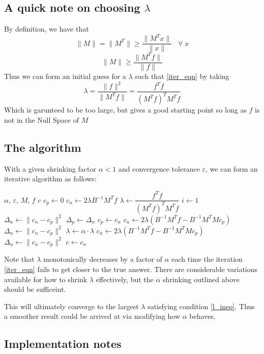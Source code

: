 \documentclass[12pt,a4paper]{article}
\newcommand{\eps}{\varepsilon}
\begin{document}
\subsection{A quick note on choosing $\lambda$}
By definition, we have that
\[
    \| M \| = \| M^T \| \ge \dfrac{\|M^Tx\|}{\|x\|} \;\;\; \forall \; x 
\]
\[
    \| M \| \ge \dfrac{\|M^Tf\|}{\|f\|}
\]
Thus we can form an initial guess for a $\lambda$ such that \ref{iter_eqn} by
taking
\[
    \lambda = \dfrac{\|f\|^2}{\|M^T f\|} = \dfrac{f^T f}{(M^T f)^T M^T f}
\]
Which is garunteed to be too large, but gives a good starting point so long as
$f$ is not in the Null Space of $M$

\newpage
\subsection{The algorithm}
With a given shrinking factor $\alpha < 1$ and convergence tolerance $\eps$,
we can form an iterative algorithm as follows:
\begin{algorithmic}
    \Require $\alpha$, $\eps$, $M$, $f$ 
    \Ensure $c$
    \State $c_p \gets 0$
    \State $c_n \gets 2 \lambda B^{-1} M^T f$
    \State $\lambda \gets \dfrac{f^T f}{(M^T f)^T M^T f}$
    \State $i \gets 1$
    \State $\Delta_n \gets \|c_n - c_p\|^2$
    \Repeat
        \State $\Delta_p \gets \Delta_n$
        \State $c_p \gets c_n$
        \State $c_n \gets 2\lambda \left( B^{-1} M^T f - B^{-1} M^T M c_p\right)$
        \State $\Delta_n \gets \|c_n - c_p\|^2$
            \State $\lambda \gets \alpha \cdot \lambda$
            \State $c_n \gets 2\lambda \left( B^{-1} M^T f - B^{-1} M^T M c_p\right)$
            \State $\Delta_n \gets \|c_n - c_p\|^2$
        \EndWhile
    \Until{$\Delta_n < \eps$}
    \State $c \gets c_n$
\end{algorithmic}
Note that $\lambda$ monotonically decreases by a factor of $\alpha$ each time
the iteration \ref{iter_eqn} fails to get closer to the true answer.
There are considerable variations available for how to shrink $\lambda$ effectively,
but the $\alpha$ shrinking outlined above should be sufficeint.

This will ultimately converge to the largest $\lambda$ satisfying condition \ref{l_ineq}.
Thus a smoother result could be arrived at via modifying how $\alpha$ behaves.

\newpage
\subsection{Implementation notes}
\end{document}
